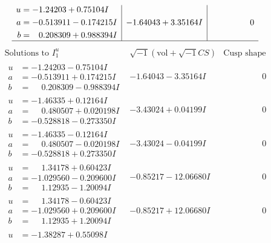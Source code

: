 \documentclass[1p]{elsarticle_modified}
\theoremstyle{definition}
\newcommand{\I}{\sqrt{-1}}
\begin{document}
$$\begin{array}{c|c|c}
\begin{aligned}
u &= -1.24203 + 0.75104 I \\
a &= -0.513911 - 0.174215 I \\
b &= \phantom{-}0.208309 + 0.988394 I\end{aligned}
 & -1.64043 + 3.35164 I & \phantom{-0.000000 } 0\\
 \hline 
 \end{array}$$\newpage$$\begin{array}{c|c|c}  
\text{Solutions to }I^u_{1}& \I (\text{vol} + \sqrt{-1}CS) & \text{Cusp shape}\\
 \hline 
\begin{aligned}
u &= -1.24203 - 0.75104 I \\
a &= -0.513911 + 0.174215 I \\
b &= \phantom{-}0.208309 - 0.988394 I\end{aligned}
 & -1.64043 - 3.35164 I & \phantom{-0.000000 } 0 \\ \hline\begin{aligned}
u &= -1.46335 + 0.12164 I \\
a &= \phantom{-}0.480507 + 0.020198 I \\
b &= -0.528818 - 0.273350 I\end{aligned}
 & -3.43024 + 0.04199 I & \phantom{-0.000000 } 0 \\ \hline\begin{aligned}
u &= -1.46335 - 0.12164 I \\
a &= \phantom{-}0.480507 - 0.020198 I \\
b &= -0.528818 + 0.273350 I\end{aligned}
 & -3.43024 - 0.04199 I & \phantom{-0.000000 } 0 \\ \hline\begin{aligned}
u &= \phantom{-}1.34178 + 0.60423 I \\
a &= -1.029560 - 0.209600 I \\
b &= \phantom{-}1.12935 - 1.20094 I\end{aligned}
 & -0.85217 - 12.06680 I & \phantom{-0.000000 } 0 \\ \hline\begin{aligned}
u &= \phantom{-}1.34178 - 0.60423 I \\
a &= -1.029560 + 0.209600 I \\
b &= \phantom{-}1.12935 + 1.20094 I\end{aligned}
 & -0.85217 + 12.06680 I & \phantom{-0.000000 } 0 \\ \hline\begin{aligned}
u &= -1.38287 + 0.55098 I \\

\end{aligned}
\end{array}$$
\end{document}

